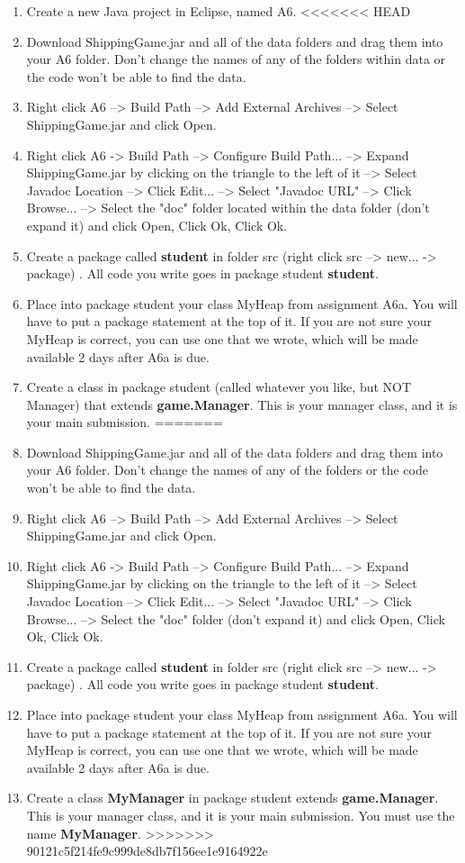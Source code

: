 \documentclass[11pt]{article}
\begin{document}
\begin{enumerate}
\item Create a new Java project in Eclipse, named A6.
<<<<<<< HEAD
\item Download ShippingGame.jar and all of the data folders and drag them into your A6 folder. Don't change the names of any of the folders within data or the code won't be able to find the data.
\item Right click A6 --> Build Path --> Add External Archives --> Select ShippingGame.jar and click Open.
\item Right click A6 -> Build Path --> Configure Build Path... --> Expand ShippingGame.jar by clicking on the triangle to the left of it --> Select Javadoc Location --> Click Edit... --> Select "Javadoc URL" --> Click Browse... --> Select the "doc" folder located within the data folder (don't expand it) and click Open, Click Ok, Click Ok.
\item Create a package called \textbf{student} in folder src (right click src --> new... -> package) . All code you write goes in package student \textbf{student}.
\item Place into package student your class MyHeap from assignment A6a. You will have to put a package statement at the top of it.
If you are not sure your MyHeap is correct, you can use one that we wrote, which will be made available 2 days after A6a is due.
\item Create a class in package student  (called whatever you like, but NOT Manager) that extends \textbf{game.Manager}. This is your manager class, and it is your main submission.
=======
\item Download ShippingGame.jar and all of the data folders and drag them into your A6 folder. Don't change the names of any of the folders or the code won't be able to find the data.
\item Right click A6 --> Build Path --> Add External Archives --> Select ShippingGame.jar and click Open.
\item Right click A6 -> Build Path --> Configure Build Path... --> Expand ShippingGame.jar by clicking on the triangle to the left of it --> Select Javadoc Location --> Click Edit... --> Select "Javadoc URL" --> Click Browse... --> Select the "doc" folder (don't expand it) and click Open, Click Ok, Click Ok.
\item Create a package called \textbf{student} in folder src (right click src --> new... -> package) . All code you write goes in package student \textbf{student}.
\item Place into package student your class MyHeap from assignment A6a. You will have to put a package statement at the top of it.
If you are not sure your MyHeap is correct, you can use one that we wrote, which will be made available 2 days after A6a is due.
\item Create a class \textbf{MyManager} in package student extends \textbf{game.Manager}. This is your manager class, and it is your main submission. You must use the name \textbf{MyManager}.
>>>>>>> 90121c5f214fe9c999de8db7f156ee1e9164922e
\end{enumerate}
\end{document}
